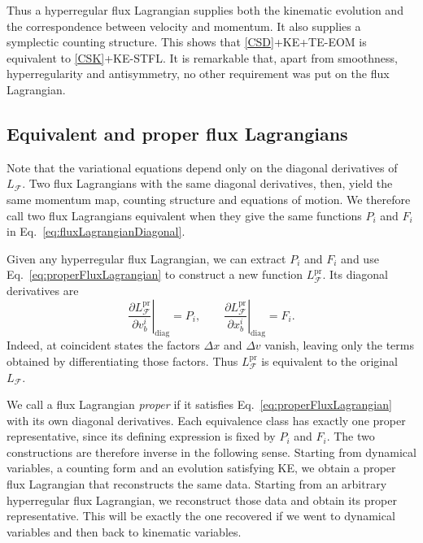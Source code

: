 \documentclass[nofootinbib,aps,pre]{revtex4-2}
\begin{document}
Thus a hyperregular flux Lagrangian supplies both the kinematic evolution and the correspondence between velocity and momentum. It also supplies a symplectic counting structure. This shows that \ref{CSD}+KE+TE-EOM is equivalent to \ref{CSK}+KE-STFL. It is remarkable that, apart from smoothness, hyperregularity and antisymmetry, no other requirement was put on the flux Lagrangian.

\subsection{Equivalent and proper flux Lagrangians}

Note that the variational equations depend only on the diagonal derivatives of $L_{\mathcal{F}}$. Two flux Lagrangians with the same diagonal derivatives, then, yield the same momentum map, counting structure and equations of motion. We therefore call two flux Lagrangians equivalent when they give the same functions $P_i$ and $F_i$ in Eq.~\eqref{eq:fluxLagrangianDiagonal}.

Given any hyperregular flux Lagrangian, we can extract $P_i$ and $F_i$ and use Eq.~\eqref{eq:properFluxLagrangian} to construct a new function $L_{\mathcal{F}}^{\mathrm{pr}}$. Its diagonal derivatives are
\begin{equation}
	\left.\frac{\partial L_{\mathcal{F}}^{\mathrm{pr}}}{\partial v_b^i}\right|_{\mathrm{diag}}
	=P_i,
	\qquad
	\left.\frac{\partial L_{\mathcal{F}}^{\mathrm{pr}}}{\partial x_b^i}\right|_{\mathrm{diag}}
	=F_i.
\end{equation}
Indeed, at coincident states the factors $\Delta x$ and $\Delta v$ vanish, leaving only the terms obtained by differentiating those factors. Thus $L_{\mathcal{F}}^{\mathrm{pr}}$ is equivalent to the original $L_{\mathcal{F}}$.

We call a flux Lagrangian \emph{proper} if it satisfies Eq.~\eqref{eq:properFluxLagrangian} with its own diagonal derivatives. Each equivalence class has exactly
one proper representative, since its defining expression is fixed by $P_i$ and $F_i$. The two constructions are therefore inverse in the following sense. Starting from dynamical variables, a counting form and an evolution satisfying KE, we obtain a proper flux Lagrangian that reconstructs the same data. Starting from an arbitrary hyperregular flux Lagrangian, we reconstruct those data and obtain its proper representative. This will be exactly the one recovered if we went to dynamical variables and then back to kinematic variables.
\end{document}
